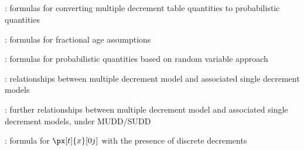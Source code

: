\subsection*{}
\item {}: formulas for converting multiple decrement table quantities to probabilistic quantities
\item {}: formulas for fractional age assumptions
\item {}: formulas for probabilistic quantities based on random variable approach
\item {}: relationships between multiple decrement model and associated single decrement models
\item {}: further relationships between multiple decrement model and associated single decrement models, under MUDD/SUDD
\item {}: formula for \(\px[t]{x}[0j]\) with the presence of discrete decrements
